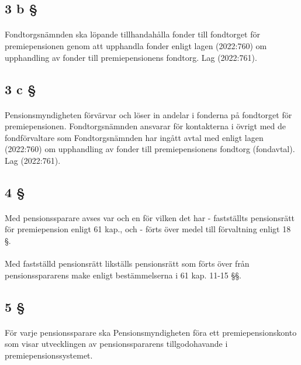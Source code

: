 \documentclass[a4paper,notitlepage,openany,10pt]{book}
\begin{document}
\subsection*{3 b §}
\paragraph*{}
Fondtorgsnämnden ska löpande tillhandahålla fonder till fondtorget för premiepensionen genom att upphandla fonder enligt lagen (2022:760) om upphandling av fonder till premiepensionens fondtorg.
Lag (2022:761).
\subsection*{3 c §}
\paragraph*{}
Pensionsmyndigheten förvärvar och löser in andelar i fonderna på fondtorget för premiepensionen. Fondtorgsnämnden ansvarar för kontakterna i övrigt med de fondförvaltare som Fondtorgsnämnden har ingått avtal med enligt lagen (2022:760) om upphandling av fonder till premiepensionens fondtorg (fondavtal).
Lag (2022:761).
\subsection*{4 §}
\paragraph*{}
Med pensionssparare avses var och en för vilken det har
\newline - fastställts pensionsrätt för premiepension enligt 61 kap., och
\newline - förts över medel till förvaltning enligt 18 §.
\paragraph*{}
Med fastställd pensionsrätt likställs pensionsrätt som förts över från pensionsspararens make enligt bestämmelserna i 61 kap. 11-15 §§.
\subsection*{5 §}
\paragraph*{}
För varje pensionssparare ska Pensionsmyndigheten föra ett premiepensionskonto som visar utvecklingen av pensionsspararens tillgodohavande i premiepensionssystemet.
\end{document}

